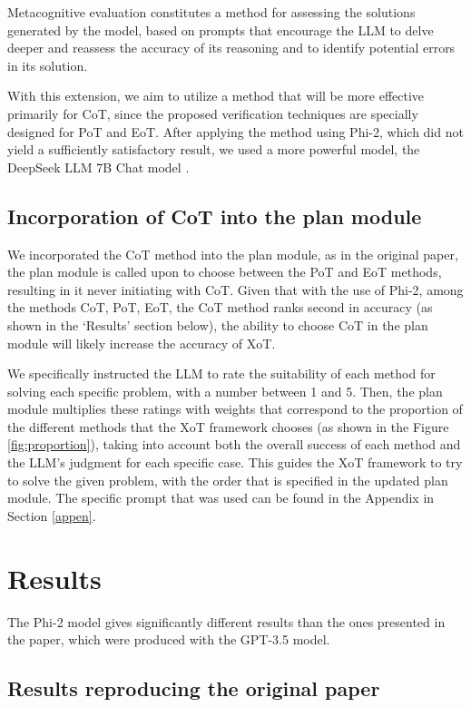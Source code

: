 \documentclass[10pt]{article} %
\begin{document}
Metacognitive evaluation constitutes a method for assessing the solutions generated by the model, based on prompts that encourage the LLM to delve deeper and reassess the accuracy of its reasoning and to identify potential errors in its solution.

With this extension, we aim to utilize a method that will be more effective primarily for CoT, since the proposed verification techniques are specially designed for PoT and EoT. After applying the method using Phi-2, which did not yield a sufficiently satisfactory result, we used a more powerful model, the DeepSeek LLM 7B Chat model \citep{deepseekai2024deepseek}.

\subsection{Incorporation of CoT into the plan module}

We incorporated the CoT method into the plan module, as in the original paper, the plan module is called upon to choose between the PoT and EoT methods, resulting in it never initiating with CoT. Given that with the use of Phi-2, among the methods CoT, PoT, EoT, the CoT method ranks second in accuracy (as shown in the `Results' section below), the ability to choose CoT in the plan module will likely increase the accuracy of XoT.

We specifically instructed the LLM to rate the suitability of each method for solving each specific problem, with a number between 1 and 5. Then, the plan module multiplies these ratings with weights that correspond to the proportion of the different methods that the XoT framework chooses (as shown in the Figure \ref{fig:proportion}), taking into account both the overall success of each method and the LLM's judgment for each specific case. This guides the XoT framework to try to solve the given problem, with the order that is specified in the updated plan module. The specific prompt that was used can be found in the Appendix in Section \ref{appen}.

\section{Results}
The Phi-2 model gives significantly different results than the ones presented in the paper, which were produced with the GPT-3.5 model.

\subsection{Results reproducing the original paper}
\end{document}
